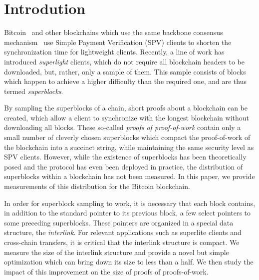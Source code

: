 \section{Introdution}

Bitcoin~\cite{bitcoin} and other blockchains which use the same backbone
consensus mechanism~\cite{EC:GarKiaLeo15} use Simple Payment Verification (SPV)
clients to shorten the synchronization time for lightweight clients. Recently, a
line of work has introduced \emph{superlight} clients, which do not require all
blockchain headers to be downloaded, but, rather, only a sample of them. This
sample consists of blocks which happen to achieve a higher difficulty than the
required one, and are thus termed \emph{superblocks}.

By sampling the superblocks of a chain, short proofs about a blockchain can be
created, which allow a client to synchronize with the longest blockchain without
downloading all blocks. These so-called \emph{proofs of proof-of-work} contain
only a small number of cleverly chosen superblocks which compact the
proof-of-work of the blockchain into a succinct string, while maintaining the
same security level as SPV clients. However, while the existence of superblocks
has been theoretically posed and the protocol has even been deployed in
practice, the distribution of superblocks within a blockchain has not been
measured. In this paper, we provide measurements of this distribution for the
Bitcoin blockchain.

In order for superblock sampling to work, it is necessary that each block
contains, in addition to the standard pointer to its previous block, a few
select pointers to some preceding superblocks. These pointers are organized in a
special data structure, the \emph{interlink}. For relevant applications such as
superlite clients and cross-chain transfers, it is critical that the interlink
structure is compact. We measure the size of the interlink structure and provide
a novel but simple optimization which can bring down its size to less than a
half. We then study the impact of this improvement on the size of proofs of
proofs-of-work.

